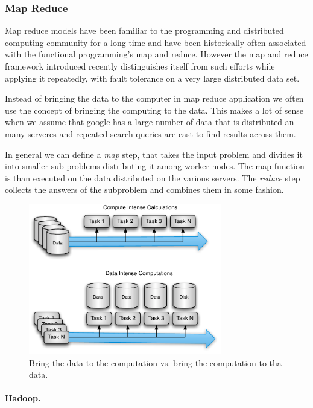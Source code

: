 
\subsubsection{Map Reduce}

Map reduce models have been familiar to the programming and distributed
computing community for a long time and have been historically often
associated with the functional programming's map and reduce. However
the map and reduce framework introduced recently \cite{Dean:mapreduce}
distinguishes itself from such efforts while
applying it repeatedly, with fault tolerance on a very large
distributed data set. 

Instead of bringing the data to the computer in map reduce application
we often use the concept of bringing the computing to the data. This
makes a lot of sense when we assume that google has a large number of
data that is distributed an many serveres and repeated search queries
are cast to find results across them. 

In general we can define a {\em map} step, that takes the input problem and divides it
into smaller sub-problems distributing it among worker nodes. The map
function is than executed on the data distributed on the various
servers. The {\em reduce} step collects the answers of the subproblem and combines
them in some fashion. 

\begin{figure}[htb]
  \centering
    \includegraphics[width=0.75\textwidth]{images/mapreduce.pdf}
  \caption{Bring the data to the computation vs. bring the computation to tha data.}
\end{figure}

\paragraph{Hadoop.}\label{S:hadoop}

